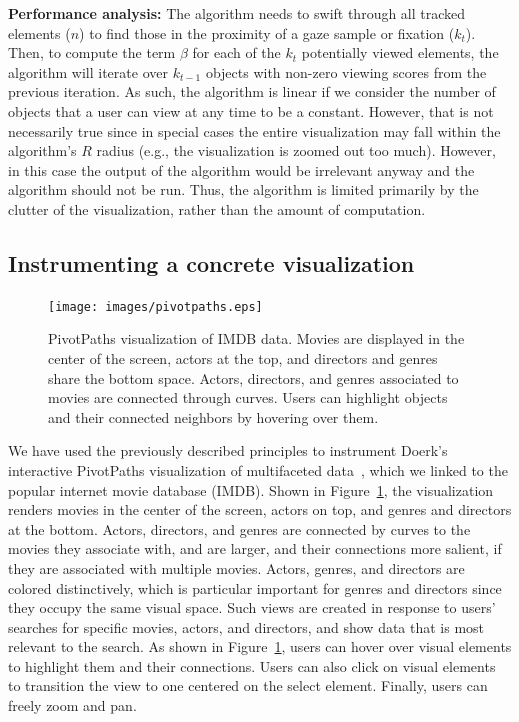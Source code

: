 {\bf Performance analysis:} The algorithm needs to swift through all tracked elements ($n$) to find those in the proximity of a gaze sample or fixation ($k_t$). Then, to compute the term $\beta$ for each of the $k_t$ potentially viewed elements, the algorithm will iterate over $k_{t-1}$ objects with non-zero viewing scores from the previous iteration. As such, the algorithm is linear if we consider the number of objects that a user can view at any time to be a constant. However, that is not necessarily true since in special cases the entire visualization may fall within the algorithm's $R$ radius (e.g., the visualization is zoomed out too much). However, in this case the output of the algorithm would be irrelevant anyway and the algorithm should not be run. Thus, the algorithm is limited primarily by the clutter of the visualization, rather than the amount of computation. 


\subsection{Instrumenting a concrete visualization}
\label{sec:InstrumentingVisualization}

\begin{figure}[htb]
  \centering
  \texttt{[image: images/pivotpaths.eps]}
  \caption{PivotPaths visualization of IMDB data. Movies are displayed in the center of the screen, actors at the top, and directors and genres share the bottom space. Actors, directors, and genres associated to movies are connected through curves. Users can highlight objects and their connected neighbors by hovering over them.}
	\label{fig:pivotpaths}
\end{figure}
We have used the previously described principles to instrument Doerk's interactive PivotPaths visualization of multifaceted data~\cite{dork2012pivotpaths}, which we linked to the popular internet movie database (IMDB). Shown in Figure~\ref{fig:pivotpaths}, the visualization renders movies in the center of the screen, actors on top, and genres and directors at the bottom. Actors, directors, and genres are connected by curves to the movies they associate with, and are larger, and their connections more salient, if they are associated with multiple movies. Actors, genres, and directors are colored distinctively, which is particular important for genres and directors since they occupy the same visual space. Such views are created in response to users' searches for specific movies, actors, and directors, and show data that is most relevant to the search. As shown in Figure~\ref{fig:pivotpaths}, users can hover over visual elements to highlight them and their connections. Users can also click on visual elements to transition the view to one centered on the select element. Finally, users can freely zoom and pan. 

